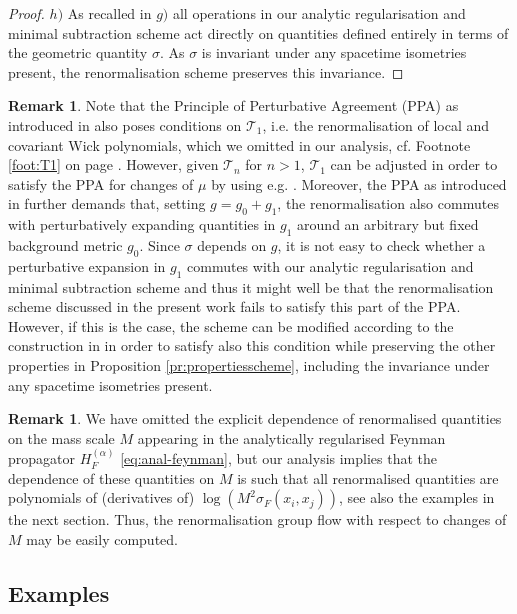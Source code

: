 \documentclass[a4paper,10pt,twoside]{article}
\numberwithin{equation}{section}
\newcounter{and}
\theoremstyle{plain}
\theoremstyle{definition}
\newtheorem{rem}[theo]{Remark}
\begin{document}
\begin{proof}
$h)$ As recalled in $g)$ all operations in our analytic regularisation and minimal subtraction scheme act directly on quantities defined entirely in terms of the geometric quantity $\sigma$. As $\sigma$ is invariant under any spacetime isometries present, the renormalisation scheme preserves this invariance.
\end{proof}

\begin{rem}\label{rem:missingPPA}
Note that the Principle of Perturbative Agreement (PPA) as introduced in  \cite{Hollands:2004yh} also poses conditions on $\mathcal{T}_1$, i.e. the renormalisation of local and covariant Wick polynomials, which we omitted in our analysis, cf. Footnote \ref{foot:T1} on page \pageref{foot:T1}. However, given $\mathcal{T}_n$ for $n>1$, $\mathcal{T}_1$ can be adjusted in order to satisfy the PPA for changes of $\mu$ by using e.g. \cite[Theorem 3.3]{DHP}. Moreover, the PPA as introduced in \cite{Hollands:2004yh} further demands that, setting $g=g_0+g_1$, the renormalisation also commutes with perturbatively expanding quantities in $g_1$ around an arbitrary but fixed background metric $g_0$. Since $\sigma$ depends on $g$, it is not easy to check whether a perturbative expansion in $g_1$ commutes with our analytic regularisation and minimal subtraction scheme and thus it might well be that the renormalisation scheme discussed in the present work fails to satisfy this part of the PPA. However, if this is the case, the scheme can be modified according to the construction in \cite{Hollands:2004yh} in order to satisfy also this condition while preserving the other properties in Proposition \ref{pr:propertiesscheme}, including the invariance under any spacetime isometries present.
\end{rem}

\begin{rem}\label{rem:rengroup}
We have omitted the explicit dependence of renormalised quantities on the mass scale $M$ appearing in the analytically regularised Feynman propagator $H^{(\alpha)}_F$ \eqref{eq:anal-feynman}, but our analysis implies that the dependence of these quantities on $M$ is such that all renormalised quantities are polynomials of (derivatives of) $\log\left( M^2 \sigma_F(x_i,x_j)\right)$, see also the examples in the next section. Thus, the renormalisation group flow with respect to changes of $M$ may be easily computed.
\end{rem}




\subsection{Examples}
\label{sec_fishsunset}
\end{document}
